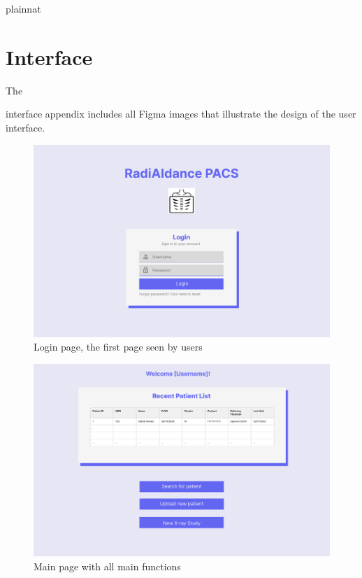 \documentclass[12pt, titlepage]{article}
\begin{document}
 {plainnat}


\newpage{}

\appendix

\section{Interface}
\hypertarget{A}{The} interface appendix includes all Figma images that illustrate the design of the user interface. 

\begin{figure}[H]
    \centering
    \includegraphics[scale=0.30]{chest-x-ray-ai.png}
    \caption{Login page, the first page seen by users}
    \label{fig:LoginPage}
\end{figure}
\begin{figure}[H]
    \centering
    \includegraphics[scale=0.30]{chest-x-ray-ai (6).png}
    \caption{Main page with all main functions}
    \label{fig:MainPage}
\end{figure}
\end{document}
